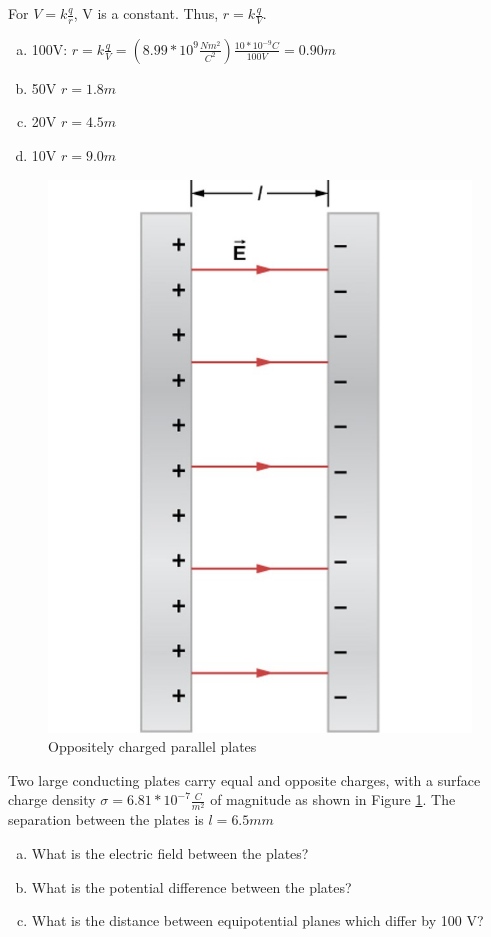 \documentclass[14pt]{memoir}
\begin{document}
For $V = k\frac{q}{r}$, V is a constant. Thus, $r = k\frac{q}{V}$.

\begin{enumerate}[(a)]
\item 100V: $r = k\frac{q}{V} = (8.99 * 10^9 \frac{Nm^2}{C^2}) \frac{10 * 10^{-9} C}{100V} = 0.90m$
\item 50V $r = 1.8m$
\item 20V $r = 4.5m$
\item 10V $r = 9.0m$
\end{enumerate}


\begin{figure}[H]
\begin{center}
\includegraphics[scale=0.50]{fig/fig_07_37.jpg}
\caption{Oppositely charged parallel plates}
\label{fig:07_37}
\end{center}
\end{figure}

Two large conducting plates carry equal and opposite charges, with a surface charge density $\sigma = 6.81 * 10^{-7} \frac{C}{m^2}$ of magnitude as shown in Figure \ref{fig:07_37}. The separation between the plates is $l = 6.5mm$ 
\begin{enumerate}[(a)]
\item What is the electric field between the plates? 
\item What is the potential difference between the plates? 
\item What is the distance between equipotential planes which differ by 100 V?
\end{enumerate}
\end{document}
